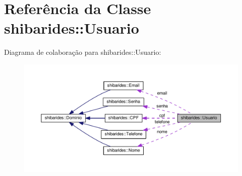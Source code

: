 \hypertarget{classshibarides_1_1Usuario}{}\section{Referência da Classe shibarides\+:\+:Usuario}
\label{classshibarides_1_1Usuario}


Diagrama de colaboração para shibarides\+:\+:Usuario\+:
\nopagebreak
\begin{figure}[H]
\begin{center}
\leavevmode
\includegraphics[width=350pt]{classshibarides_1_1Usuario__coll__graph}
\end{center}
\end{figure}
